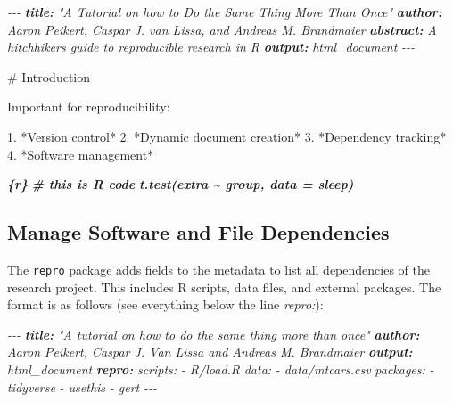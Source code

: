 \documentclass[psych,tutorial,submit,moreauthors,pdftex]{mdpi}
\newenvironment{Shaded}{\begin{snugshade}}{\end{snugshade}}
\newcommand{\AnnotationTok}[1]{\textcolor[rgb]{0.56,0.35,0.01}{\textbf{\textit{#1}}}}
\newcommand{\CommentTok}[1]{\textcolor[rgb]{0.56,0.35,0.01}{\textit{#1}}}
\newcommand{\FunctionTok}[1]{\textcolor[rgb]{0.00,0.00,0.00}{#1}}
\newcommand{\InformationTok}[1]{\textcolor[rgb]{0.56,0.35,0.01}{\textbf{\textit{#1}}}}
\newcommand{\NormalTok}[1]{#1}
\newcommand{\SpecialStringTok}[1]{\textcolor[rgb]{0.31,0.60,0.02}{#1}}
\begin{document}
\begin{Shaded}
\begin{Highlighting}[]
\CommentTok{{-}{-}{-}}
\AnnotationTok{title:}\CommentTok{ "A Tutorial on how to Do the Same Thing More Than Once"}
\AnnotationTok{author:}\CommentTok{ Aaron Peikert, Caspar J. van Lissa, and Andreas M. Brandmaier}
\AnnotationTok{abstract:}\CommentTok{ A hitchhiker\textquotesingle{}s guide to reproducible research in R}
\AnnotationTok{output:}\CommentTok{ html\_document}
\CommentTok{{-}{-}{-}}

\FunctionTok{\# Introduction}

\NormalTok{Important for reproducibility:}

\SpecialStringTok{1. }\NormalTok{*Version control*}
\SpecialStringTok{2. }\NormalTok{*Dynamic document creation*}
\SpecialStringTok{3. }\NormalTok{*Dependency tracking*}
\SpecialStringTok{4. }\NormalTok{*Software management*}

\InformationTok{\textasciigrave{}\textasciigrave{}\textasciigrave{}\{r\}}
\InformationTok{\# this is R code}
\InformationTok{t.test(extra \textasciitilde{} group, data = sleep)}
\InformationTok{\textasciigrave{}\textasciigrave{}\textasciigrave{}}
\end{Highlighting}
\end{Shaded}

\hypertarget{manage-software-and-file-dependencies}{%
\subsection{Manage Software and File
Dependencies}\label{manage-software-and-file-dependencies}}

The \texttt{repro} package adds fields to the metadata to list all
dependencies of the research project. This includes R scripts, data
files, and external packages. The format is as follows (see everything
below the line \emph{repro:}):

\begin{Shaded}
\begin{Highlighting}[]
\CommentTok{{-}{-}{-}}
\AnnotationTok{title:}\CommentTok{ "A tutorial on how to do the same thing more than once"}
\AnnotationTok{author:}\CommentTok{ Aaron Peikert, Caspar J. Van Lissa and Andreas M. Brandmaier}
\AnnotationTok{output:}\CommentTok{ html\_document}
\AnnotationTok{repro:}
\CommentTok{  scripts:}
\CommentTok{    {-} R/load.R}
\CommentTok{  data:}
\CommentTok{    {-} data/mtcars.csv}
\CommentTok{  packages:}
\CommentTok{    {-} tidyverse}
\CommentTok{    {-} usethis}
\CommentTok{    {-} gert}
\CommentTok{{-}{-}{-}}
\end{Highlighting}
\end{Shaded}
\end{document}

